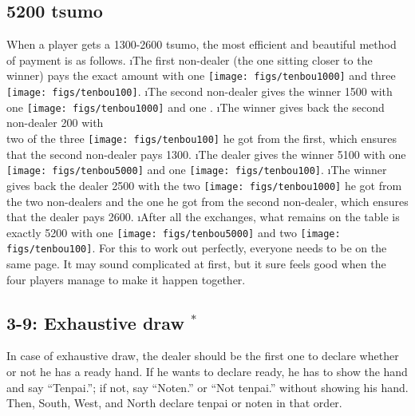 \subsection*{5200 {\jap tsumo}}
When a player gets a 1300-2600 {\jap tsumo}, the most efficient and beautiful method of payment is as follows.
\be
\i The first non-dealer (the one sitting closer to the winner) pays the exact amount with one \texttt{[image: figs/tenbou1000]} and three \texttt{[image: figs/tenbou100]}.
\i The second non-dealer gives the winner 1500 with\\
one \texttt{[image: figs/tenbou1000]} and one .
\i The winner gives back the second non-dealer 200 with\\
two of the three \texttt{[image: figs/tenbou100]} he got from the first,
which ensures that the second non-dealer pays 1300.
\i The dealer gives the winner 5100 with one \texttt{[image: figs/tenbou5000]} and one \texttt{[image: figs/tenbou100]}.
\i The winner gives back the dealer 2500 with the two \texttt{[image: figs/tenbou1000]} he got from the two non-dealers and the one  he got from the second non-dealer, which ensures that the dealer pays 2600.
\i After all the exchanges, what remains on the table is exactly 5200 with one \texttt{[image: figs/tenbou5000]} and two \texttt{[image: figs/tenbou100]}.
\ee
For this to work out perfectly, everyone needs to be on the same page. It may sound complicated at first, but it sure feels good when the four players manage to make it happen together. 

\subsection*{3-9: Exhaustive draw $^{*}$}
In case of exhaustive draw, the dealer should be the first one to declare whether or not he has a ready hand. If he wants to declare ready, he has to show the hand and say ``{\jap Tenpai}.''; if not, say ``{\jap Noten}.'' or ``Not {\jap tenpai}.'' without showing his hand. Then, South, West, and North declare {\jap tenpai} or {\jap noten} in that order. 

